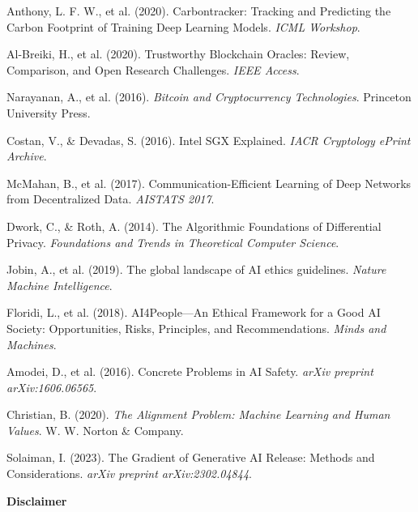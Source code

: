 \documentclass[12pt,a4paper]{article}
\begin{document}
\begin{thebibliography}{99}
Anthony, L. F. W., et al. (2020). Carbontracker: Tracking and Predicting the Carbon Footprint of Training Deep Learning Models. \textit{ICML Workshop}.

Al-Breiki, H., et al. (2020). Trustworthy Blockchain Oracles: Review, Comparison, and Open Research Challenges. \textit{IEEE Access}.

Narayanan, A., et al. (2016). \textit{Bitcoin and Cryptocurrency Technologies}. Princeton University Press.

Costan, V., \& Devadas, S. (2016). Intel SGX Explained. \textit{IACR Cryptology ePrint Archive}.

McMahan, B., et al. (2017). Communication-Efficient Learning of Deep Networks from Decentralized Data. \textit{AISTATS 2017}.

Dwork, C., \& Roth, A. (2014). The Algorithmic Foundations of Differential Privacy. \textit{Foundations and Trends in Theoretical Computer Science}.

Jobin, A., et al. (2019). The global landscape of AI ethics guidelines. \textit{Nature Machine Intelligence}.

Floridi, L., et al. (2018). AI4People—An Ethical Framework for a Good AI Society: Opportunities, Risks, Principles, and Recommendations. \textit{Minds and Machines}.

Amodei, D., et al. (2016). Concrete Problems in AI Safety. \textit{arXiv preprint arXiv:1606.06565}.

Christian, B. (2020). \textit{The Alignment Problem: Machine Learning and Human Values}. W. W. Norton \& Company.

Solaiman, I. (2023). The Gradient of Generative AI Release: Methods and Considerations. \textit{arXiv preprint arXiv:2302.04844}.

\end{thebibliography}

\newpage
\thispagestyle{plain}
\vspace*{2cm}

\begin{center}
\textbf{\Large Disclaimer}
\end{center}

\vspace{1cm}
\end{document}
